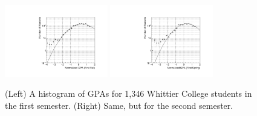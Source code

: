 \documentclass[../../../main.tex]{subfiles}
\begin{document}
\begin{figure}
\centering
\includegraphics[width=0.4\textwidth]{figures/Nov15_plot3.pdf}
\includegraphics[width=0.4\textwidth]{figures/Nov15_plot9.pdf}
\caption{\label{fig:grade} (Left) A histogram of GPAs for 1,346 Whittier College students in the first semester.  (Right) Same, but for the second semester.}
\end{figure}
\end{document}
